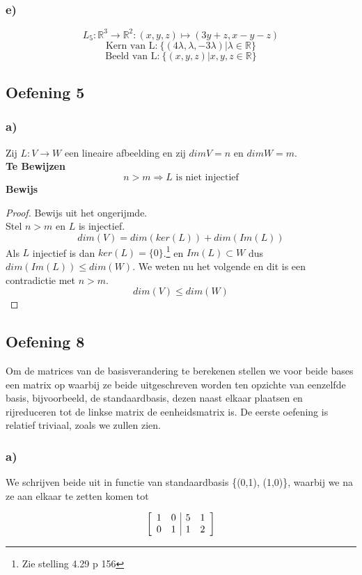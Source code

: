 \documentclass[lineaire_algebra_oplossingen.tex]{subfiles}
\begin{document}
\subsubsection{e)}
$$
L_5:\mathbb{R}^3\rightarrow\mathbb{R}^2:(x,y,z)\mapsto (3y+z,x-y-z)
$$
$$
\text{Kern van L:} \ \{(4\lambda ,\lambda ,-3\lambda)|\lambda \in \mathbb{R} \}
$$
$$
\text{Beeld van L:} \ \{(x ,y ,z)|x,y,z \in \mathbb{R} \}
$$


\subsection{Oefening 5}
\subsubsection*{a)}
Zij $L:V \rightarrow W$ een lineaire afbeelding en zij $dim V = n$ en $dim W = m$.\\
\textbf{Te Bewijzen}
\[
n > m \Rightarrow L \text{ is niet injectief}
\]
\textbf{Bewijs}
\begin{proof}
Bewijs uit het ongerijmde.\\
Stel $n>m$ en $L$ is injectief.
\[
dim(V) = dim(ker(L)) + dim(Im(L))
\]
Als $L$ injectief is dan $ker(L)=\{0\}$.\footnote{Zie stelling 4.29 p 156} en $Im(L) \subset W$ dus $dim(Im(L))\le dim(W)$. We weten nu het volgende en dit is een contradictie met $n>m$.
\[
dim(V) \le dim(W)
\]
\end{proof}

\subsection{Oefening 8}
Om de matrices van de basisverandering te berekenen stellen we voor beide bases een matrix op waarbij ze beide uitgeschreven worden ten opzichte van eenzelfde basis, bijvoorbeeld, de standaardbasis, dezen naast elkaar plaatsen en rijreduceren tot de linkse matrix de eenheidsmatrix is. De eerste oefening is relatief triviaal, zoals we zullen zien.
\subsubsection*{a)}
We schrijven beide uit in functie van standaardbasis \{(0,1), (1,0)\}, waarbij we na ze aan elkaar te zetten komen tot

\[
\left[
\begin{array}{ c c | c c }
1 & 0 & 5 & 1\\
0 & 1 & 1 & 2
\end{array}
\right]
\]
\end{document}

